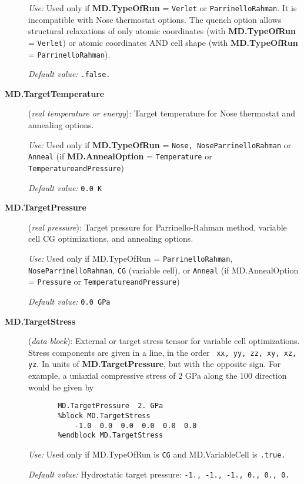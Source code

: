 \documentclass[11pt]{article}
\begin{document}
\begin{description}
{\it Use:} Used only if {\bf MD.TypeOfRun} = {\tt Verlet} or 
{\tt ParrinelloRahman}.
It is incompatible with Nose thermostat options.
The quench option allows structural relaxations of
only atomic coordinates (with {\bf MD.TypeOfRun} = {\tt Verlet})
or atomic coordinates AND cell shape 
(with {\bf MD.TypeOfRun} = {\tt ParrinelloRahman}).

{\it Default value:} {\tt .false.}

\item[{\bf MD.TargetTemperature}] ({\it real temperature or energy}): 
Target temperature for Nose thermostat and annealing options.

{\it Use:} Used only if {\bf MD.TypeOfRun} = {\tt Nose, NoseParrinelloRahman}
or {\tt Anneal} (if {\bf MD.AnnealOption} = {\tt Temperature} or 
{\tt TemperatureandPressure})

{\it Default value:} {\tt 0.0 K}

\item[{\bf MD.TargetPressure}] ({\it real pressure}): 
Target pressure for Parrinello-Rahman method, variable cell CG optimizations,
and annealing options.

{\it Use:} Used only if MD.TypeOfRun = 
{\tt ParrinelloRahman}, {\tt NoseParrinelloRahman},
{\tt CG} (variable cell), or {\tt Anneal} 
(if MD.AnnealOption = {\tt Pressure} or {\tt TemperatureandPressure})

{\it Default value:} {\tt 0.0 GPa}


\item[{\bf MD.TargetStress}] ({\it data block}):
External or target stress tensor for variable cell optimizations.
Stress components are given in a line, in the order {\tt
xx, yy, zz, xy, xz, yz}. In units of {\bf MD.TargetPressure},
but with the opposite sign. For example, a uniaxial compressive stress 
of 2 GPa along the 100 direction would be given by
\begin{verbatim}
       MD.TargetPressure  2. GPa
       %block MD.TargetStress
           -1.0  0.0  0.0  0.0  0.0  0.0
       %endblock MD.TargetStress
\end{verbatim}

{\it Use:} Used only if MD.TypeOfRun is {\tt CG} and 
MD.VariableCell is {\tt .true.} 
 
{\it Default value:} Hydrostatic target pressure: 
{\tt -1., -1., -1., 0., 0., 0.}




\end{description}
\end{document}
